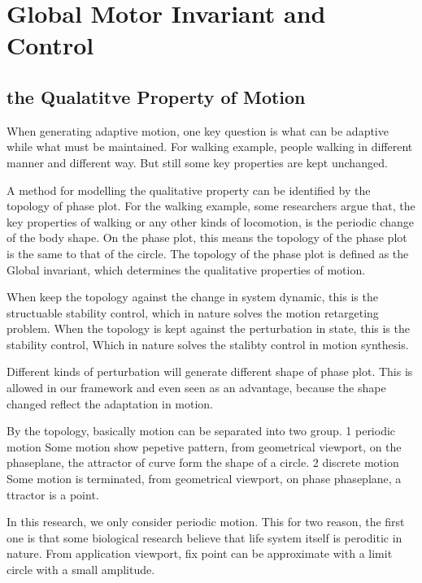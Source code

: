 \section{Global Motor Invariant and Control}
\subsection{the Qualatitve Property of Motion}
When generating adaptive motion, one key question is what can be adaptive while what must be maintained.
For walking example, people walking in different manner and different way.
But still some key properties are kept unchanged.

A method for modelling the qualitative property can be identified by the topology of phase plot.
For the walking example, some researchers argue that, the key properties of walking or any other kinds of locomotion, is the periodic change of the body shape.
On the phase plot, this means the topology of the phase plot is the same to that of the circle.
The topology of the phase plot is defined as the Global invariant, which determines the qualitative properties of motion.

When keep the topology against the change in system dynamic, this is the structuable stability control, which in nature solves the motion retargeting problem.
When the topology is kept against the perturbation in state, this is the stability control,
Which in nature solves the stalibty control in motion synthesis.

Different kinds of perturbation will generate different shape of phase plot. This is allowed in our framework and even seen as an advantage, because the shape changed reflect the adaptation in motion. 


By the topology,
basically motion can be separated into two group.
1 periodic motion
Some motion show pepetive pattern, from geometrical viewport, on the phaseplane, the attractor of curve form the shape of a circle.
2 discrete motion
Some motion is terminated, from geometrical viewport, on phase phaseplane,  a ttractor is a point.

In this research, we only consider periodic motion. This for two reason, the first one is that some biological research believe that life system itself is peroditic in nature. From application viewport, fix point can be approximate with a limit circle with a small amplitude.

